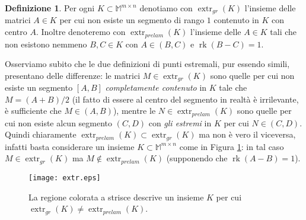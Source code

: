 \documentclass[a4paper,11pt]{book}
\theoremstyle{plain}
\theoremstyle{definition}
\newtheorem{defn}{Definizione}[chapter]
\theoremstyle{remark}
\newcommand{\M}{\mathbb{M}}
\DeclareMathOperator{\rk}{rk}
\DeclareMathOperator{\extr}{extr}
\begin{document}
\begin{defn}\label{defn:1}
	Per ogni $K\subset \M^{m\times n}$ denotiamo con $\extr_{gr}(K)$ l'insieme delle matrici $A\in K$ per cui non esiste un segmento di rango $1$ contenuto in $K$ con centro $A$. Inoltre denoteremo con $\extr_{prelam}(K)$ l'insieme delle $A\in K$ tali che non esistono nemmeno $B,C\in K$ con $A\in (B,C)$ e $\rk(B-C)=1$.
\end{defn}
Osserviamo subito che le due definizioni di punti estremali, pur essendo simili, presentano delle differenze: le matrici $M\in\extr_{gr}(K)$ sono quelle per cui non esiste un segmento $[A,B]$ \textit{completamente contenuto} in $K$ tale che $M=(A+B)/2$ (il fatto di essere al centro del segmento in realtà è irrilevante, è sufficiente che $M\in(A,B)$), mentre le $N\in\extr_{prelam}(K)$ sono quelle per cui non esiste alcun segmento $(C,D)$ con \textit{gli estremi} in $K$ per cui $N\in(C,D)$. Quindi chiaramente $\extr_{prelam}(K)\subset \extr_{gr}(K)$ ma non è vero il viceversa, infatti basta considerare un insieme $K\subset\M^{m\times n}$ come in Figura \ref{fig:5}: in tal caso $M\in\extr_{gr}(K)$ ma $M\not\in\extr_{prelam}(K)$ (supponendo che $\rk(A-B)=1$).
\begin{figure}[H]
	\begin{minipage}[c]{0.5\textwidth}
		\texttt{[image: extr.eps]}
	\end{minipage}\hfill
	\begin{minipage}[c]{0.35\textwidth}
		\caption{La regione colorata a strisce descrive un insieme $K$ per cui $\extr_{gr}(K)\neq \extr_{prelam}(K)$.}
		\label{fig:5}
	\end{minipage}
\end{figure}
\end{document}

